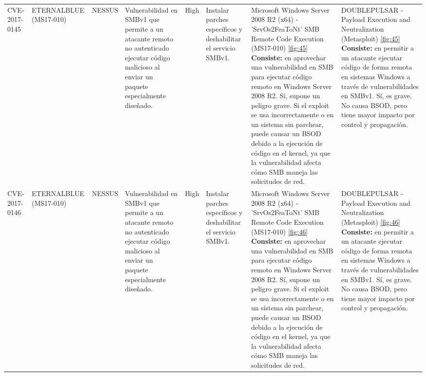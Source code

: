 \documentclass[a4paper,12pt]{article} %
\begin{document}
\begin{table}[hp!]
{\begin{tabular}{m{2.1cm}|m{2.6cm}|m{2cm}|m{4cm}|m{1cm}|m{3cm}|m{5cm}|m{5cm}}
  {CVE-2017-0145} & {ETERNALBLUE (MS17-010)} & {NESSUS} & {Vulnerabilidad en SMBv1 que permite a un atacante remoto no autenticado ejecutar código malicioso al enviar un paquete especialmente diseñado.} & {High} & {Instalar parches específicos y deshabilitar el servicio SMBv1.} & {Microsoft Windows Server 2008 R2 (x64) - 'SrvOs2FeaToNt' SMB Remote Code Execution (MS17-010) \ref{fig:45} \vspace{2mm} \hline \vspace{2mm} {\color{blue} \textbf{Consiste:} en aprovechar una vulnerabilidad en SMB para ejecutar código remoto en Windows Server 2008 R2.} \vspace{2mm} \hline \vspace{2mm} {\color{red} Sí, supone un peligro grave. Si el exploit se usa incorrectamente o en un sistema sin parchear, puede causar un BSOD debido a la ejecución de código en el kernel, ya que la vulnerabilidad afecta cómo SMB maneja las solicitudes de red. }} & {DOUBLEPULSAR - Payload Execution and Neutralization (Metasploit) \ref{fig:45}   \vspace{2mm} \hline \vspace{2mm} {\color{blue} \textbf{Consiste:} en permitir a un atacante ejecutar código de forma remota en sistemas Windows a través de vulnerabilidades en SMBv1.} \vspace{2mm} \hline \vspace{2mm} {\color{red} Sí, es grave. No causa BSOD, pero tiene mayor impacto por control y propagación.}}\\
  {CVE-2017-0146} & {ETERNALBLUE (MS17-010)} & {NESSUS} & {Vulnerabilidad en SMBv1 que permite a un atacante remoto no autenticado ejecutar código malicioso al enviar un paquete especialmente diseñado.} & {High} & {Instalar parches específicos y deshabilitar el servicio SMBv1.} & { Microsoft Windows Server 2008 R2 (x64) - 'SrvOs2FeaToNt' SMB Remote Code Execution (MS17-010) \ref{fig:46} \vspace{2mm} \hline \vspace{2mm} {\color{blue} \textbf{Consiste:} en aprovechar una vulnerabilidad en SMB para ejecutar código remoto en Windows Server 2008 R2.} \vspace{2mm} \hline \vspace{2mm} {\color{red} Sí, supone un peligro grave. Si el exploit se usa incorrectamente o en un sistema sin parchear, puede causar un BSOD debido a la ejecución de código en el kernel, ya que la vulnerabilidad afecta cómo SMB maneja las solicitudes de red.}} & {DOUBLEPULSAR - Payload Execution and Neutralization (Metasploit) \ref{fig:46}  \vspace{2mm} \hline \vspace{2mm} {\color{blue} \textbf{Consiste:} en permitir a un atacante ejecutar código de forma remota en sistemas Windows a través de vulnerabilidades en SMBv1.} \vspace{2mm} \hline \vspace{2mm} {\color{red} Sí, es grave. No causa BSOD, pero tiene mayor impacto por control y propagación.}}\\

\end{tabular}}
\end{table}
\end{document}
